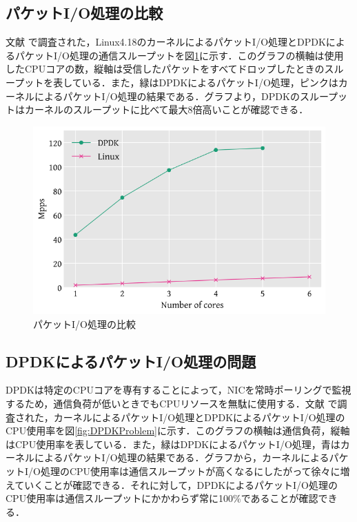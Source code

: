 \subsection{パケットI/O処理の比較}
文献 \cite{XDP} で調査された，Linux4.18のカーネルによるパケットI/O処理とDPDKによるパケットI/O処理の通信スループットを図\ref{fig:PacketIOComparison}に示す．このグラフの横軸は使用したCPUコアの数，縦軸は受信したパケットをすべてドロップしたときのスループットを表している．また，緑はDPDKによるパケットI/O処理，ピンクはカーネルによるパケットI/O処理の結果である．グラフより，DPDKのスループットはカーネルのスループットに比べて最大8倍高いことが確認できる．

\begin{figure}[htb]
  \centering
  \includegraphics[width=\columnwidth]{pictures/PacketIOComparison.png}
  \caption{パケットI/O処理の比較}
  \label{fig:PacketIOComparison}
\end{figure}

\subsection{DPDKによるパケットI/O処理の問題}
DPDKは特定のCPUコアを専有することによって，NICを常時ポーリングで監視するため，通信負荷が低いときでもCPUリソースを無駄に使用する．文献 \cite{XDP} で調査された，カーネルによるパケットI/O処理とDPDKによるパケットI/O処理のCPU使用率を図\ref{fig:DPDKProblem}に示す．このグラフの横軸は通信負荷，縦軸はCPU使用率を表している．また，緑はDPDKによるパケットI/O処理，青はカーネルによるパケットI/O処理の結果である．グラフから，カーネルによるパケットI/O処理のCPU使用率は通信スループットが高くなるにしたがって徐々に増えていくことが確認できる．それに対して，DPDKによるパケットI/O処理のCPU使用率は通信スループットにかかわらず常に100\%であることが確認できる．


